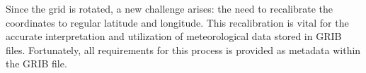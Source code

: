 Since the grid is rotated, a new challenge arises: the need to recalibrate the coordinates to regular latitude and longitude. This recalibration is vital for the accurate interpretation and utilization of meteorological data stored in GRIB files. Fortunately, all requirements for this process is provided as metadata within the GRIB file.







